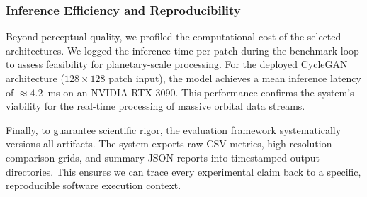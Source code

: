 \subsubsection{Inference Efficiency and Reproducibility}
Beyond perceptual quality, we profiled the computational cost of the selected architectures.
We logged the inference time per patch during the benchmark loop to assess feasibility for planetary-scale processing.
For the deployed CycleGAN architecture ($128 \times 128$ patch input), the model achieves a mean inference latency of $\approx 4.2$~ms on an NVIDIA RTX 3090.
This performance confirms the system's viability for the real-time processing of massive orbital data streams.

Finally, to guarantee scientific rigor, the evaluation framework systematically versions all artifacts.
The system exports raw CSV metrics, high-resolution comparison grids, and summary JSON reports into timestamped output directories.
This ensures we can trace every experimental claim back to a specific, reproducible software execution context.

